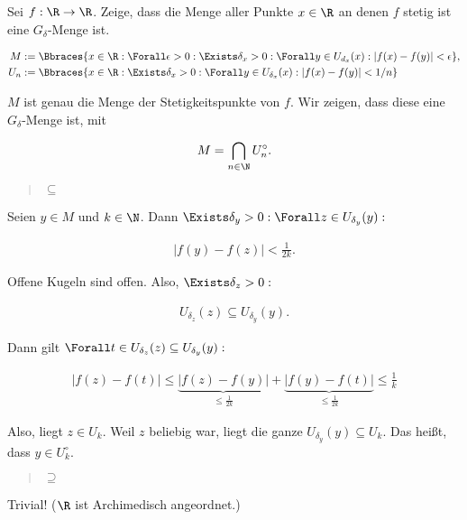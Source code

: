 \begin{exercise}

Sei $f: \R \rightarrow \R$. Zeige, dass die Menge aller Punkte $x \in \R$ an denen $f$ stetig ist eine $G_{\delta}$-Menge ist.

\end{exercise}

\begin{solution}

\begin{align*}
  M & := \Bbraces
  {
    x \in \R:
    \Forall \epsilon > 0:
    \Exists \delta_x > 0:
    \Forall y \in U_{d_x}(x):
    |f(x) - f(y)| < \epsilon
  }, \\
  U_n & := \Bbraces
  {
    x \in \R:
    \Exists \delta_x > 0:
    \Forall y \in U_{\delta_x}(x):
    |f(x) - f(y)| < 1/n
  }
\end{align*}

$M$ ist genau die Menge der Stetigkeitspunkte von $f$.
Wir zeigen, dass diese eine $G_\delta$-Menge ist, mit

\begin{align*}
  M = \bigcap_{n \in \N} U_n^\circ.
\end{align*}

\blockquote{$\subseteq$}:
Seien $y \in M$ und $k \in \N$.
Dann $\Exists \delta_y > 0: \Forall z \in U_{\delta_y}(y):$

\begin{align*}
    |f(y) - f(z)| < \frac{1}{2k}.
\end{align*}

Offene Kugeln sind offen.
Also, $\Exists \delta_z > 0:$

\begin{align*}
  U_{\delta_z}(z)
  \subseteq
  U_{\delta_y}(y).
\end{align*}

Dann gilt $\Forall t \in U_{\delta_z}(z) \subseteq U_{\delta_y}(y):$

\begin{align*}
    |f(z) - f(t)|
    \leq
    \underbrace{|f(z) - f(y)|}_{\leq \frac{1}{2 k}} +
    \underbrace{|f(y) - f(t)|}_{\leq \frac{1}{2 k}}
    \leq
    \frac{1}{k}
\end{align*}

Also, liegt $z \in U_k$.
Weil $z$ beliebig war, liegt die ganze $U_{\delta_y}(y) \subseteq U_k$.
Das heißt, dass $y \in U_k^\circ.$ \\

\blockquote{$\supseteq$}:
Trivial!
($\R$ ist Archimedisch angeordnet.)

\end{solution}
